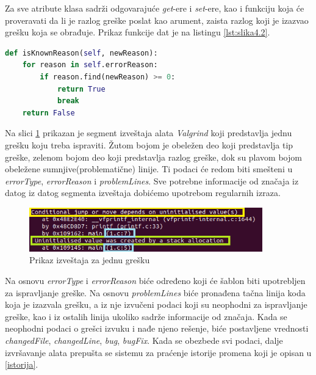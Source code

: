 \documentclass[12pt,oneside]{memoir}
\theoremstyle{plain}
\theoremstyle{definition}
\begin{document}
Za sve atribute klasa sadrži odgovarajuće \textit{get}-ere i \textit{set}-ere, kao i funkciju koja će proveravati da li je razlog greške poslat kao arument, zaista razlog koji je izazvao grešku koja se obrađuje. Prikaz funkcije dat je na listingu \ref{lst:slika4.2}.

\begin{lstlisting}[style=mystyle,caption={Prikaz funkcije koja proverava validnost razloga greške}, label={lst:slika4.2},language={Python}] 
def isKnownReason(self, newReason):
	for reason in self.errorReason:
		if reason.find(newReason) >= 0:
			return True
			break
	return False
\end{lstlisting}


Na slici \ref{fig:slika4.3} prikazan je segment izveštaja alata \textit{Valgrind} koji predstavlja jednu grešku koju treba ispraviti. Žutom bojom je obeležen deo koji predstavlja tip greške, zelenom bojom deo koji predstavlja razlog greške, dok su plavom bojom obeležene sumnjive(problematične) linije. Ti podaci će redom biti smešteni u \textit{errorType}, \textit{errorReason} i \textit{problemLines}. Sve potrebne informacije od značaja iz datog iz datog segmenta izveštaja dobićemo upotrebom regularnih izraza.

\begin{figure}[!ht]
  \centering
  \includegraphics[width=0.9\textwidth]{ErrorClassExplaination.png}
  \caption{Prikaz izveštaja za jednu grešku}
  \label{fig:slika4.3}
\end{figure}

Na osnovu \textit{errorType} i \textit{errorReason} biće određeno koji će šablon biti upotrebljen za ispravljanje greške. Na osnovu \textit{problemLines} biće pronađena tačna linija koda koja je izazvala grešku, a iz nje izvučeni podaci koji su neophodni za ispravljanje greške, kao i iz ostalih linija ukoliko sadrže informacije od značaja. Kada se neophodni podaci o grešci izvuku i nađe njeno rešenje, biće postavljene vrednosti \textit{changedFile}, \textit{changedLine}, \textit{bug}, \textit{bugFix}. Kada se obezbede svi podaci, dalje izvršavanje alata prepušta se sistemu za praćenje istorije promena koji je opisan u \ref{istorija}.
\end{document}
